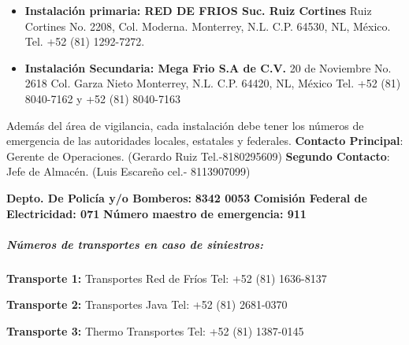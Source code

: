 \begin{itemize}
	\item \textbf{Instalación primaria: RED DE FRIOS Suc. Ruiz Cortines}
Ruiz Cortines No. 2208, Col. Moderna. Monterrey, N.L. C.P. 64530, NL, México.
Tel. +52 (81) 1292-7272.
	\item \textbf{Instalación Secundaria: Mega Frio S.A de C.V.}
20 de Noviembre No. 2618 Col. Garza Nieto Monterrey, N.L. C.P. 64420, NL, México
Tel. +52 (81) 8040-7162 y +52 (81) 8040-7163

\end{itemize}


Además del área de vigilancia, cada instalación debe tener los números de emergencia de las autoridades locales, estatales y federales.
\textbf{Contacto Principal}: Gerente de Operaciones. (Gerardo Ruiz Tel.-8180295609)
\textbf{Segundo Contacto}: Jefe de Almacén. (Luis Escareño cel.- 8113907099)

\textbf{Depto. De Policía y/o Bomberos:} \textbf{8342 0053}
\textbf{Comisión Federal de Electricidad: 071}
\textbf{Número maestro de emergencia: 911}

\subparagraph{Números de transportes en caso de siniestros:}

\textbf{Transporte 1:} Transportes Red de Fríos
Tel: +52 (81) 1636-8137

\textbf{Transporte 2:} Transportes Java
Tel: +52 (81) 2681-0370

\textbf{Transporte 3:} Thermo Transportes
Tel: +52 (81) 1387-0145
